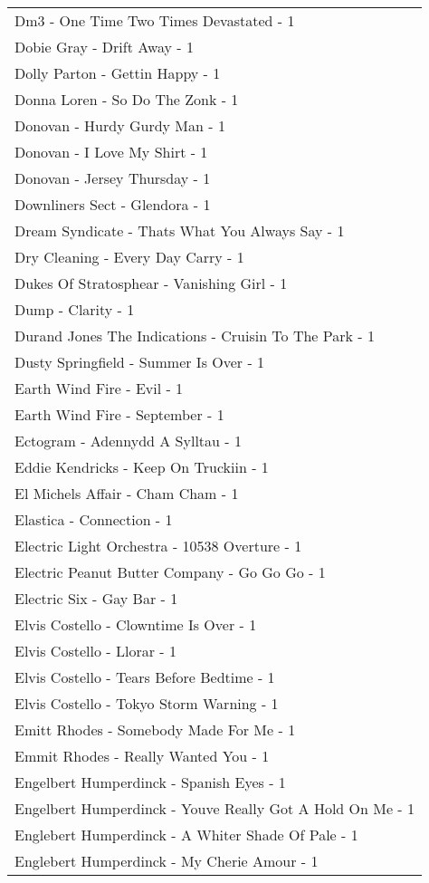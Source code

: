 \documentclass[
]{article}
\begin{document}
\begin{longtable}{l}
Dm3 - One Time Two Times Devastated - 1 \\ 
Dobie Gray - Drift Away - 1 \\ 
Dolly Parton - Gettin Happy - 1 \\ 
Donna Loren - So Do The Zonk - 1 \\ 
Donovan - Hurdy Gurdy Man - 1 \\ 
Donovan - I Love My Shirt - 1 \\ 
Donovan - Jersey Thursday - 1 \\ 
Downliners Sect - Glendora - 1 \\ 
Dream Syndicate - Thats What You Always Say - 1 \\ 
Dry Cleaning - Every Day Carry - 1 \\ 
Dukes Of Stratosphear - Vanishing Girl - 1 \\ 
Dump - Clarity - 1 \\ 
Durand Jones The Indications - Cruisin To The Park - 1 \\ 
Dusty Springfield - Summer Is Over - 1 \\ 
Earth Wind Fire - Evil - 1 \\ 
Earth Wind Fire - September - 1 \\ 
Ectogram - Adennydd A Sylltau - 1 \\ 
Eddie Kendricks - Keep On Truckiin - 1 \\ 
El Michels Affair - Cham Cham - 1 \\ 
Elastica - Connection - 1 \\ 
Electric Light Orchestra - 10538 Overture - 1 \\ 
Electric Peanut Butter Company - Go Go Go - 1 \\ 
Electric Six - Gay Bar - 1 \\ 
Elvis Costello - Clowntime Is Over - 1 \\ 
Elvis Costello - Llorar - 1 \\ 
Elvis Costello - Tears Before Bedtime - 1 \\ 
Elvis Costello - Tokyo Storm Warning - 1 \\ 
Emitt Rhodes - Somebody Made For Me - 1 \\ 
Emmit Rhodes - Really Wanted You - 1 \\ 
Engelbert Humperdinck - Spanish Eyes - 1 \\ 
Engelbert Humperdinck - Youve Really Got A Hold On Me - 1 \\ 
Englebert Humperdinck - A Whiter Shade Of Pale - 1 \\ 
Englebert Humperdinck - My Cherie Amour - 1 \\ 

\end{longtable}
\end{document}
